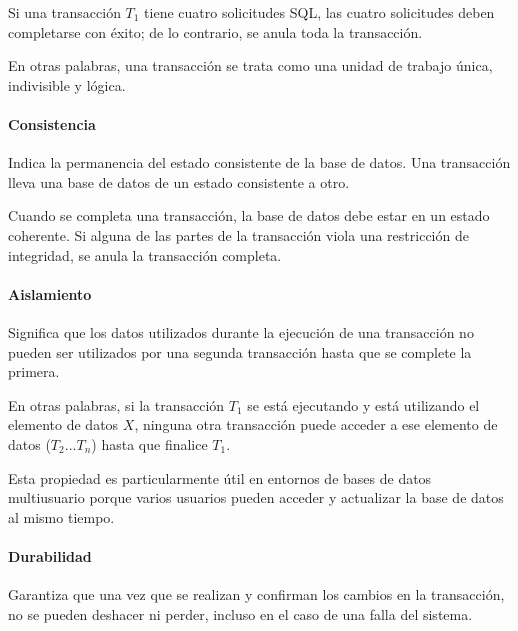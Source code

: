 Si una transacción $T_{1}$ tiene cuatro solicitudes SQL, las cuatro solicitudes deben completarse con éxito; de lo contrario, se anula toda la transacción.


En otras palabras, una transacción se trata como una unidad de trabajo única, indivisible y lógica.
\paragraph*{Consistencia}
Indica la permanencia del estado consistente de la base de datos. Una transacción lleva una base de datos de un estado consistente a otro. 


Cuando se completa una transacción, la base de datos debe estar en un estado coherente. Si alguna de las partes de la transacción viola una restricción de integridad, se anula la transacción completa.
\paragraph*{Aislamiento}
Significa que los datos utilizados durante la ejecución de una transacción no pueden ser utilizados por una segunda transacción hasta que se complete la primera. 


En otras palabras, si la transacción $T_{1}$ se está ejecutando y está utilizando el elemento de datos $X$, ninguna otra transacción puede acceder a ese elemento de datos ($T_{2}...T_{n}$) hasta que finalice $T_{1}$.


Esta propiedad es particularmente útil en entornos de bases de datos multiusuario porque varios usuarios pueden acceder y actualizar la base de datos al mismo tiempo.
\paragraph*{Durabilidad}

Garantiza que una vez que se realizan y confirman los cambios en la transacción, no se pueden deshacer ni perder, incluso en el caso de una falla del sistema.
